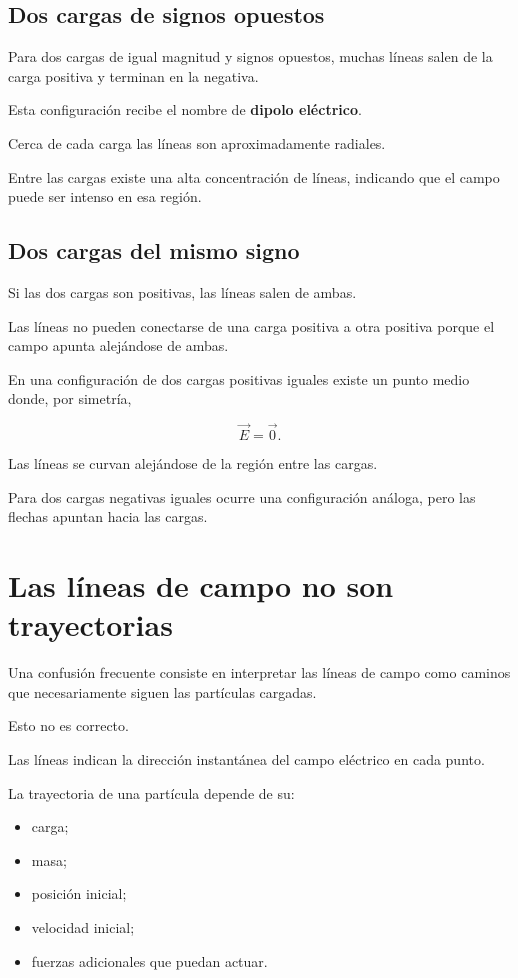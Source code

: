 \subsection{Dos cargas de signos opuestos}

Para dos cargas de igual magnitud y signos opuestos, muchas líneas salen de la carga
positiva y terminan en la negativa.

Esta configuración recibe el nombre de \textbf{dipolo eléctrico}.

Cerca de cada carga las líneas son aproximadamente radiales.

Entre las cargas existe una alta concentración de líneas, indicando que el campo
puede ser intenso en esa región.


\subsection{Dos cargas del mismo signo}

Si las dos cargas son positivas, las líneas salen de ambas.

Las líneas no pueden conectarse de una carga positiva a otra positiva porque el campo
apunta alejándose de ambas.

En una configuración de dos cargas positivas iguales existe un punto medio donde,
por simetría,

\[
\vec E=\vec 0.
\]

Las líneas se curvan alejándose de la región entre las cargas.

Para dos cargas negativas iguales ocurre una configuración análoga, pero las flechas
apuntan hacia las cargas.


\section{Las líneas de campo no son trayectorias}

Una confusión frecuente consiste en interpretar las líneas de campo como caminos que
necesariamente siguen las partículas cargadas.

Esto no es correcto.

Las líneas indican la dirección instantánea del campo eléctrico en cada punto.

La trayectoria de una partícula depende de su:

\begin{itemize}
    \item carga;
    \item masa;
    \item posición inicial;
    \item velocidad inicial;
    \item fuerzas adicionales que puedan actuar.
\end{itemize}

